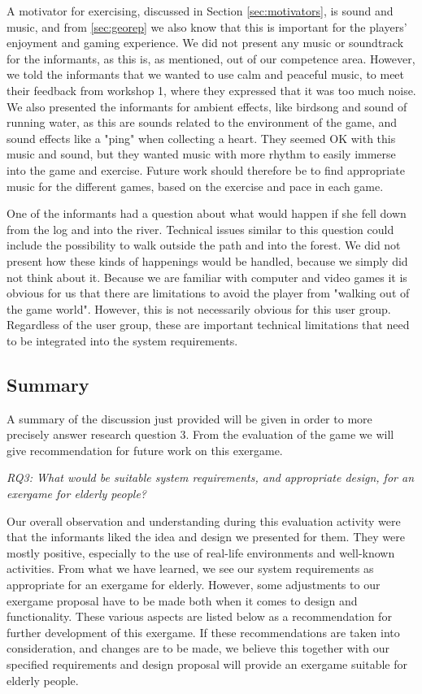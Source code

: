 A motivator for exercising, discussed in Section \ref{sec:motivators}, is sound and music, and from \ref{sec:georep} we also know that this is important for the players' enjoyment and gaming experience. We did not present any music or soundtrack for the informants, as this is, as mentioned, out of our competence area. However, we told the informants that we wanted to use calm and peaceful music, to meet their feedback from workshop 1, where they expressed that it was too much noise. We also presented the informants for ambient effects, like birdsong and sound of running water, as this are sounds related to the environment of the game, and sound effects like a "ping" when collecting a heart. They seemed OK with this music and sound, but they wanted music with more rhythm to easily immerse into the game and exercise. Future work should therefore be to find appropriate music for the different games, based on the exercise and pace in each game. 

One of the informants had a question about what would happen if she fell down from the log and into the river. Technical issues similar to this question could include the possibility to walk outside the path and into the forest. We did not present how these kinds of happenings would be handled, because we simply did not think about it. Because we are familiar with computer and video games it is obvious for us that there are limitations to avoid the player from "walking out of the game world". However, this is not necessarily obvious for this user group. Regardless of the user group, these are important technical limitations that need to be integrated into the system requirements. 

\subsection{Summary}
\label{sec:summarydiscW2}
A summary of the discussion just provided will be given in order to more precisely answer research question 3. From the evaluation of the game we will give recommendation for future work on this exergame. 

\emph{RQ3: What would be suitable system requirements, and appropriate design, for an exergame for elderly people?}

Our overall observation and understanding during this evaluation activity were that the informants liked the idea and design we presented for them. They were mostly positive, especially to the use of real-life environments and well-known activities. From what we have learned, we see our system requirements as appropriate for an exergame for elderly. However, some adjustments to our exergame proposal have to be made both when it comes to design and functionality. These various aspects are listed below as a recommendation for further development of this exergame. If these recommendations are taken into consideration, and changes are to be made, we believe this together with our specified requirements and design proposal will provide an exergame suitable for elderly people.  

